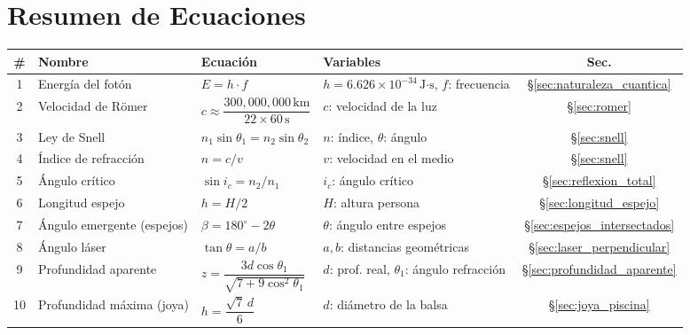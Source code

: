 \documentclass[12pt, a4paper]{article}
\theoremstyle{definition}
\begin{document}
\section*{Resumen de Ecuaciones}
\label{sec:tabla_ecuaciones}

\begin{center}
\begin{longtable}{@{}clp{5.5cm}p{3cm}c@{}}
\toprule
\textbf{\#} & \textbf{Nombre} & \textbf{Ecuación} & \textbf{Variables} & \textbf{Sec.} \\
\midrule
\endhead
1 & Energía del fotón & \(E = h \cdot f\) &
  \(h=6.626\times10^{-34}\,\text{J·s}\), \(f\): frecuencia & \S\ref{sec:naturaleza_cuantica} \\[4pt]

2 & Velocidad de Römer & \(c \approx \dfrac{300{,}000{,}000\,\text{km}}{22\times60\,\text{s}}\) &
  \(c\): velocidad de la luz & \S\ref{sec:romer} \\[4pt]

3 & Ley de Snell & \(n_1\sin\theta_1 = n_2\sin\theta_2\) &
  \(n\): índice, \(\theta\): ángulo & \S\ref{sec:snell} \\[4pt]

4 & Índice de refracción & \(n = c/v\) &
  \(v\): velocidad en el medio & \S\ref{sec:snell} \\[4pt]

5 & Ángulo crítico & \(\sin i_c = n_2/n_1\) &
  \(i_c\): ángulo crítico & \S\ref{sec:reflexion_total} \\[4pt]

6 & Longitud espejo & \(h = H/2\) &
  \(H\): altura persona & \S\ref{sec:longitud_espejo} \\[4pt]

7 & Ángulo emergente (espejos) & \(\beta = 180^{\circ} - 2\theta\) &
  \(\theta\): ángulo entre espejos & \S\ref{sec:espejos_intersectados} \\[4pt]

8 & Ángulo láser & \(\tan\theta = a/b\) &
  \(a, b\): distancias geométricas & \S\ref{sec:laser_perpendicular} \\[4pt]

9 & Profundidad aparente & \(z = \dfrac{3d\cos\theta_1}{\sqrt{7+9\cos^2\theta_1}}\) &
  \(d\): prof. real, \(\theta_1\): ángulo refracción & \S\ref{sec:profundidad_aparente} \\[4pt]

10 & Profundidad máxima (joya) & \(h = \dfrac{\sqrt{7}\,d}{6}\) &
  \(d\): diámetro de la balsa & \S\ref{sec:joya_piscina} \\[4pt]


\end{longtable}
\end{center}
\end{document}
